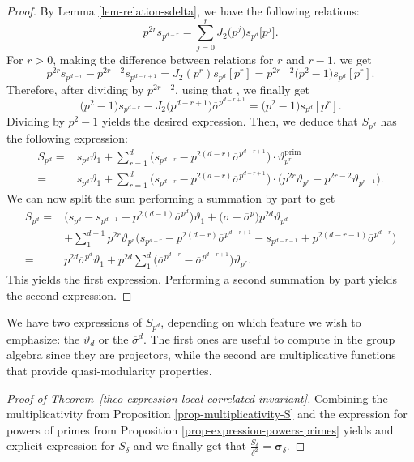 \begin{proof}
 By Lemma \ref{lem-relation-sdelta}, we have the following relations:
 \[ p^{2r}s_{p^{d-r}} = \sum_{j=0}^{r} J_2\bigl(p^j\bigr) s_{p^d}\big[p^j\big]. \]
 For $r>0$, making the difference between relations for $r$ and $r-1$, we get
 \[ p^{2r}s_{p^{d-r}}-p^{2r-2}s_{p^{d-r+1}} = J_2(p^r)s_{p^d}[p^r] = p^{2r-2}\bigl(p^2-1\bigr)s_{p^d}[p^r]. \]
 Therefore, after dividing by $p^{2r-2}$, using that , we finally get
 \[ \bigl(p^2-1\bigr)s_{p^{d-r}} -J_2\bigl(p^{d-r+1}\bigr)\overline{\sigma}^{p^{d-r+1}} = \bigl(p^2-1\bigr)s_{p^d}[p^r]. \]
 Dividing by $p^2-1$ yields the desired expression. Then, we deduce that $S_{p^d}$ has the following expression:
 \begin{align*}
 S_{p^d} ={} & s_{p^d}\vartheta_1 + \sum_{r=1}^d \bigl(s_{p^{d-r}}-p^{2(d-r)}\overline{\sigma}^{p^{d-r+1}} \bigr)\cdot \vartheta_{p^r}^\mathrm{prim} \\
 ={} & s_{p^d}\vartheta_1 + \sum_{r=1}^d \bigl(s_{p^{d-r}}-p^{2(d-r)}\overline{\sigma}^{p^{d-r+1}} \bigr)\cdot \bigl(p^{2r}\vartheta_{p^r}-p^{2r-2}\vartheta_{p^{r-1}} \bigr).
 \end{align*}
 We can now split the sum performing a summation by part to get
 \begin{align*}
 S_{p^d}= {}& \bigl(s_{p^d}-s_{p^{d-1}}+p^{2(d-1)}\overline{\sigma}^{p^d}\bigr)\vartheta_1 +\bigl(\sigma-\overline{\sigma}^p\bigr)p^{2d}\vartheta_{p^d} \\
 & + \sum_1^{d-1} p^{2r}\vartheta_{p^r} \bigl(s_{p^{d-r}} -p^{2(d-r)}\overline{\sigma}^{p^{d-r+1}}-s_{p^{d-r-1}}+p^{2(d-r-1)}\overline{\sigma}^{p^{d-r}} \bigr) \\
 ={} & p^{2d}\overline{\sigma}^{p^d}\vartheta_1 +p^{2d}\sum_1^d \bigl(\overline{\sigma}^{p^{d-r}} - \overline{\sigma}^{p^{d-r+1}} \bigr)\vartheta_{p^r}.
 \end{align*}
 This yields the first expression. Performing a second summation by part yields the second expression.
\end{proof}

We have two expressions of $S_{p^d}$, depending on which feature we wish to emphasize: the $\vartheta_d$ or the $\overline{\sigma}^d$. The first ones are useful to compute in the group algebra since they are projectors, while the second are multiplicative functions that provide quasi-modularity properties.

\begin{proof}[Proof of Theorem~\ref{theo-expression-local-correlated-invariant}]
Combining the multiplicativity from Proposition \ref{prop-multiplicativity-S} and the expression for powers of primes from Proposition \ref{prop-expression-powers-primes} yields and explicit expression for $S_\delta$ and we finally get that $\frac{S_\delta}{\delta^2}=\boldsymbol{\sigma}_\delta$.
\end{proof}
